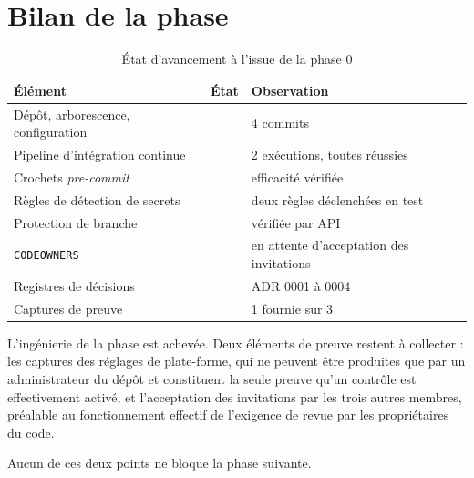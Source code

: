 \section{Bilan de la phase}

\begin{table}[H]
\centering
\caption{État d'avancement à l'issue de la phase 0}
\label{tab:bilan-phase0}
\small
\begin{tabular}{@{}llp{6.6cm}@{}}
\toprule
\textbf{Élément} & \textbf{État} & \textbf{Observation} \\
\midrule
Dépôt, arborescence, configuration & \fait{} & 4 commits \\
Pipeline d'intégration continue    & \fait{} & 2 exécutions, toutes réussies \\
Crochets \emph{pre-commit}         & \fait{} & efficacité vérifiée \\
Règles de détection de secrets     & \fait{} & deux règles déclenchées en test \\
Protection de branche              & \fait{} & vérifiée par API \\
\texttt{CODEOWNERS}                & \encours{} & en attente d'acceptation des invitations \\
Registres de décisions             & \fait{} & ADR 0001 à 0004 \\
Captures de preuve                 & \encours{} & 1 fournie sur 3 \\
\bottomrule
\end{tabular}
\end{table}

L'ingénierie de la phase est achevée. Deux éléments de preuve restent à
collecter : les captures des réglages de plate-forme, qui ne peuvent être
produites que par un administrateur du dépôt et constituent la seule preuve
qu'un contrôle est effectivement activé, et l'acceptation des invitations par
les trois autres membres, préalable au fonctionnement effectif de l'exigence de
revue par les propriétaires du code.

Aucun de ces deux points ne bloque la phase suivante.
